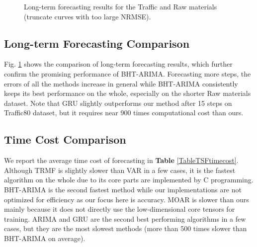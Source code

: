 \documentclass[letterpaper]{article} %
\numberwithin{theorem}{section}
\begin{document}
\begin{figure}[h]
	\centering
	\label{Multistep_Traffic80} 
	 \label{Multistep_Raw}
	\caption{\label{raw2246_multistep} Long-term forecasting  results for the Traffic  and Raw materials  (truncate curves with too large NRMSE).}
\end{figure}




\subsection{Long-term Forecasting  Comparison} 

Fig. \ref{raw2246_multistep}  shows the comparison of long-term forecasting results, which further confirm the promising performance of BHT-ARIMA. Forecasting  more  steps, the errors of all the  methods  increase in general while BHT-ARIMA consistently keeps its best performance on the whole, especially on the shorter Raw materials  dataset. Note that GRU slightly outperforms our method after  15 steps on Traffic80 dataset, but it requires near 900  times computational cost than ours.     

\subsection{Time Cost Comparison} 
We report the average time cost of forecasting in \textbf{Table}  \ref{TableTSFtimecost}.    Although TRMF is slightly slower   than VAR in a few cases,  it is the fastest algorithm on the whole due to its core parts are implemented by C programming. BHT-ARIMA  is the second fastest method while our implementations are not optimized for efficiency as our focus here is accuracy. MOAR is slower than ours mainly because it does not directly use the low-dimensional core tensors for training.  ARIMA and GRU are  the second best performing  algorithms in a few cases, but  they are the most slowest methods (more than  500 times slower than BHT-ARIMA on average).
\end{document}
